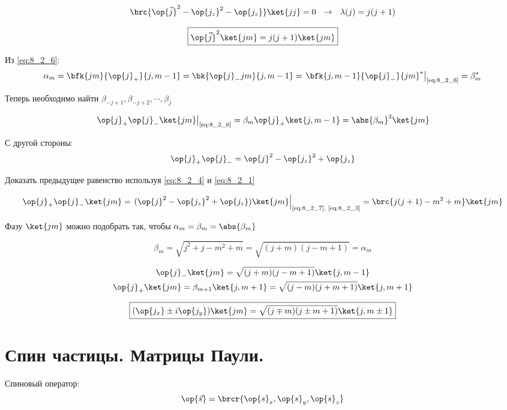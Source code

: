 $$
\brc{\op{\vec{j}}^2 - \op{j_z}^2 - \op{j_z}} \ket{jj} = 0 ~~\rightarrow~~ \lambda(j) = j(j+1)
$$

\begin{equation}
\label{eq:8_2_7}
\boxed {
	\op{\vec{j}}^2 \ket{jm} = j(j+1) \ket{jm}
}
\end{equation}

Из \eqref{eq:8_2_6}:
$$
\alpha_m = \bfk{jm}{\op{j}_{+}}{j, m-1} = \bk{\op{j}_{-}jm}{j, m-1} = \left. \bfk{j,m-1}{\op{j}_{-}}{jm}^* \right|_{\text{\eqref{eq:8_2_6}}} = \beta_m^*
$$

Теперь необходимо найти $\beta_{-j+1}, \beta_{-j+2}, \cdots, \beta_{j}$

$$
\left. \op{j}_{+} \op{j}_{-} \ket{jm} \right|_{\text{\eqref{eq:8_2_6}}} = \beta_m \op{j}_{+} \ket{j, m-1} = \abs{\beta_m}^2 \ket{jm}
$$

С другой стороны:
$$
\op{j}_{+} \op{j}_{-} = \op{j}^2 - \op{j_z}^2 + \op{j_z}
$$

\begin{excr}
Доказать предыдущее равенство используя \eqref{eq:8_2_4} и \eqref{eq:8_2_1}
\end{excr}

$$
\op{j}_{+} \op{j}_{-} \ket{jm} = \left. (\op{j}^2 - \op{j_z}^2 + \op{j_z}) \ket{jm} \right|_{\text{\eqref{eq:8_2_7}, \eqref{eq:8_2_3}}} = \brc{j(j+1) - m^2 + m} \ket{jm}
$$

Фазу $\ket{jm}$ можно подобрать так, чтобы $\alpha_m = \beta_m  = \abs{\beta_m}$

$$
\beta_m = \sqrt{j^2 + j - m^2 + m} = \sqrt{(j+m)(j-m+1)} = \alpha_m
$$

$$
\begin{gathered}
\op{j}_{-} \ket{jm} = \sqrt{(j+m)(j-m+1)} \ket{j, m-1} \\
\op{j}_{+} \ket{jm} = \beta_{m+1} \ket{j, m+1} = \sqrt{(j-m)(j+m+1)} \ket{j, m+1}
\end{gathered}
$$

\begin{equation}
\label{eq:8_2_8}
\boxed {
	(\op{j_x} \pm i \op{j_y}) \ket{jm} = \sqrt{(j \mp m)(j \pm m + 1)} \ket{j, m \pm 1}
}
\end{equation}


\section{Спин частицы. Матрицы Паули.}

Спиновый оператор:
$$
\op{\vec{s}} = \brcr{\op{s}_x, \op{s}_y, \op{s}_z}
$$

